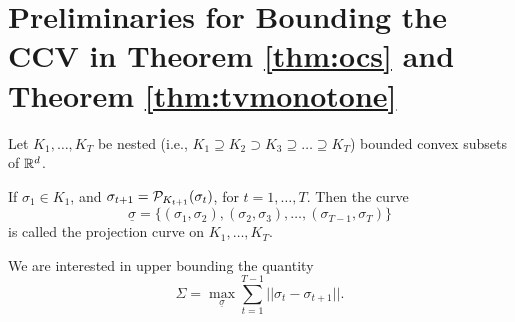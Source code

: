\section{Preliminaries for Bounding the CCV in Theorem \ref{thm:ocs} and Theorem \ref{thm:tvmonotone}}
% 
%
%
%
%

Let $K_1, \dots, K_T$ be nested (i.e., $K_1 \supseteq K_2 \supset K_3 \supseteq \dots \supseteq K_T$) bounded convex subsets of ${\mathbb{R}}^d$. 

\begin{definition}\label{defn:projectioncurve}
If $\sigma_1\in K_1$, and $\sigma_{t+1} = \mathcal{P}_{K_{t+1}}(\sigma_t)$, for $t=1, \dots, T$. Then the curve 
$${\underline \sigma}= \{(\sigma_1,\sigma_2), (\sigma_2,\sigma_3), \dots, (\sigma_{T-1},\sigma_T)\}$$ is called the projection curve on $K_1, \dots, K_T$.
\end{definition}


We are interested in upper bounding the quantity 
\begin{equation}\label{eq:totalDistance}
\Sigma = \max_{{\underline \sigma}} \sum_{t=1}^{T-1} ||\sigma_t - \sigma_{t+1}||.
\end{equation}

